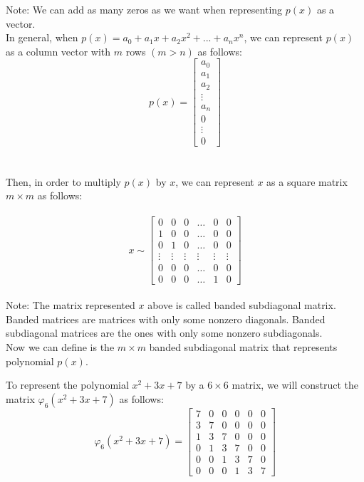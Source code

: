 Note: We can add as many zeros as we want when representing $p(x)$ as a vector.\\
In general, when $p(x)=a_0+a_1x+a_2x^2+...+a_nx^n$, we can represent $p(x)$ as a column vector with $m$ rows $(m>n)$ as follows:\\
\[p(x) = \left[\begin{array}{c}a_0\\a_1\\a_2\\\vdots\\a_n\\0\\\vdots\\0\end{array}\right]\]
\\
\\
Then, in order to multiply $p(x)$ by $x$, we can represent $x$ as a square matrix $m\times m$ as follows:\\
\\
\[x \sim \left[\begin{array}{cccccc}0 & 0 & 0 & \hdots & 0 & 0\\1 & 0 & 0 & \hdots & 0 & 0\\0 & 1 & 0 & \hdots & 0 & 0\\\vdots & \vdots & \vdots & \vdots & \vdots & \vdots\\0 & 0 & 0 & \hdots & 0 & 0\\0 & 0 & 0 & \hdots & 1 & 0\end{array}\right]\]
\\
Note: The matrix represented $x$ above is called banded subdiagonal matrix. Banded matrices are matrices with only some nonzero diagonals. Banded subdiagonal matrices are the ones with only some nonzero subdiagonals.\\
Now we can define  is the $m\times m$ banded subdiagonal matrix that represents polynomial $p(x)$.\\

\begin{example}{}
To represent the polynomial $x^2+3x+7$ by a $6\times 6$ matrix, we will construct the matrix $\varphi_6(x^2 + 3x + 7)$ as follows:
\[\varphi_6(x^2 + 3x + 7)=\left[\begin{array}{cccccc}7 & 0 & 0 & 0 & 0 & 0\\3 & 7 & 0 & 0 & 0 & 0\\1 & 3 & 7 & 0 & 0 & 0\\0 & 1 & 3 & 7 & 0 & 0\\0 & 0 & 1 & 3 & 7 & 0\\0 & 0 & 0 & 1 & 3 & 7\end{array}\right]\]

\end{example}


